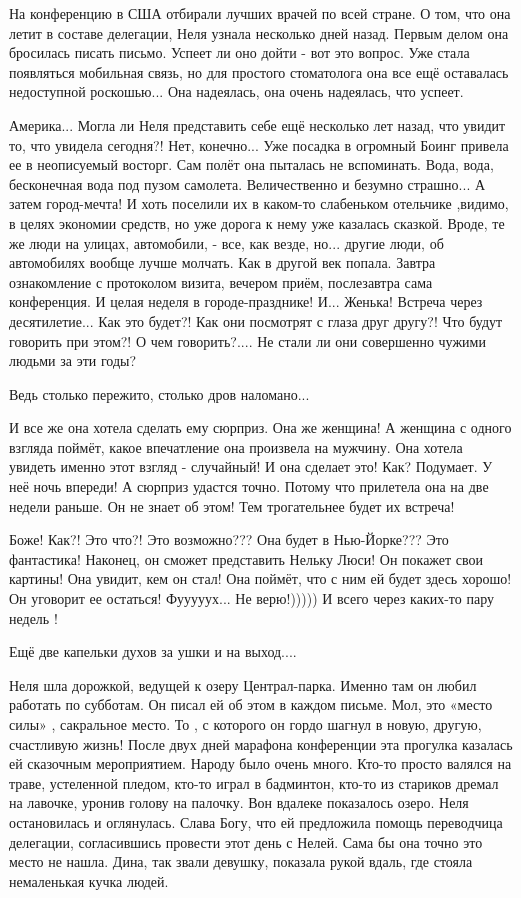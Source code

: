 \zzrule

На конференцию в США отбирали лучших врачей по всей стране. О том, что она летит
в составе делегации, Неля узнала несколько дней назад. Первым делом она бросилась
писать письмо. Успеет ли оно дойти - вот это вопрос. Уже стала появляться
мобильная связь, но для простого стоматолога она все ещё оставалась недоступной
роскошью... Она надеялась, она очень надеялась, что успеет.

\zzrule

Америка... Могла ли Неля представить себе ещё несколько лет назад, что увидит
то, что увидела сегодня?! Нет, конечно... Уже посадка в огромный Боинг привела
ее в неописуемый восторг. Сам полёт она пыталась не вспоминать. Вода, вода,
бесконечная вода под пузом самолета. Величественно и безумно страшно... А затем
город-мечта! И хоть поселили их в каком-то слабеньком отельчике ,видимо, в
целях экономии средств, но уже дорога к нему уже казалась сказкой. Вроде, те же
люди на улицах, автомобили, - все, как везде, но... другие люди, об автомобилях
вообще лучше молчать. Как в другой век попала. Завтра ознакомление с протоколом
визита, вечером приём, послезавтра сама конференция. И целая неделя в
городе-празднике! И... Женька! Встреча через десятилетие... Как это будет?! Как
они посмотрят с глаза друг другу?! Что будут говорить при этом?! О чем
говорить?.... Не стали ли они совершенно чужими людьми за эти годы?

Ведь столько пережито, столько дров наломано...

И все же она хотела сделать ему сюрприз. Она же женщина! А женщина с одного
взгляда поймёт, какое впечатление она произвела на мужчину. Она хотела увидеть
именно этот взгляд - случайный! И она сделает это! Как? Подумает. У неё ночь
впереди! А сюрприз удастся точно. Потому что прилетела она на две недели
раньше. Он не знает об этом! Тем трогательнее будет их встреча! 

Боже! Как?! Это что?! Это возможно??? Она будет в Нью-Йорке??? Это фантастика!
Наконец, он сможет представить Нельку Люси! Он покажет свои картины! Она
увидит, кем он стал! Она поймёт, что с ним ей будет здесь хорошо! Он уговорит ее
остаться! Фууууух... Не верю!))))) И всего через каких-то пару недель ! 

Ещё две капельки духов за ушки и на выход....

Неля шла дорожкой, ведущей к озеру Централ-парка. Именно там он любил работать по
субботам. Он писал ей об этом в каждом письме. Мол, это «место силы» , сакральное
место. То , с которого он гордо шагнул в новую, другую, счастливую жизнь! После
двух дней марафона конференции эта прогулка казалась ей сказочным
мероприятием. Народу было очень много. Кто-то просто валялся на траве, устеленной
пледом, кто-то играл в бадминтон, кто-то из стариков дремал на лавочке, уронив
голову на палочку. Вон вдалеке показалось озеро. Неля остановилась и
оглянулась. Слава Богу, что ей предложила помощь переводчица
делегации, согласившись провести этот день с Нелей. Сама бы она точно это место
не нашла. Дина, так звали девушку, показала рукой вдаль, где стояла немаленькая
кучка людей.

